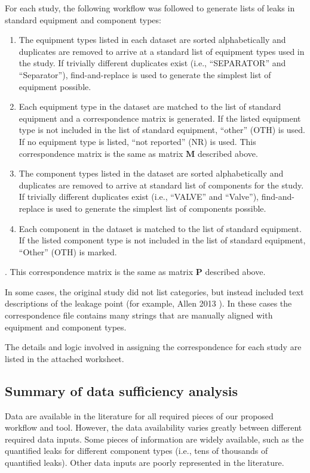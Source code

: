 \documentclass[11pt]{report}
\begin{document}
{{{{For each study, the following workflow was followed to generate lists of leaks in standard equipment and component types:
\begin{enumerate}
\item The equipment types listed in each dataset are sorted alphabetically and duplicates are removed to arrive at a standard list of equipment types used in the study. If trivially different duplicates exist (i.e., ``SEPARATOR'' and ``Separator''), find-and-replace is used to generate the simplest list of equipment possible.
\item Each equipment type in the dataset are matched to the list of standard equipment and a correspondence matrix is generated. If the listed equipment type is not included in the list of standard equipment, ``other'' (OTH) is used. If no equipment type is listed, ``not reported'' (NR) is used. This correspondence matrix is the same as matrix $\textbf{M}$ described above.
\item The component types listed in the dataset are sorted alphabetically and duplicates are removed to arrive at standard list of components for the study.  If trivially different duplicates exist (i.e., ``VALVE'' and ``Valve''), find-and-replace is used to generate the simplest list of components possible.
\item Each component in the dataset is matched to the list of standard equipment. If the listed component type is not included in the list of standard equipment, ``Other'' (OTH) is marked.\end{enumerate}. This correspondence matrix is the same as matrix $\textbf{P}$ described above.

In some cases, the original study did not list categories, but instead included text descriptions of the leakage point (for example, Allen 2013 \cite{Allen2013}). In these cases the correspondence file contains many strings that are manually aligned with equipment and component types.

The details and logic involved in assigning the correspondence for each study are listed in the attached worksheet.

\subsection{Summary of data sufficiency analysis}

Data are available in the literature for all required pieces of our proposed workflow and tool. However, the data availability varies greatly between different required data inputs. Some pieces of information are widely available, such as the quantified leaks for different component types (i.e., tens of thousands of quantified leaks). Other data inputs are poorly represented in the literature.

}}}}
\end{document}
